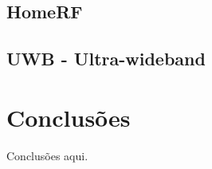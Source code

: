 \documentclass[conference]{IEEEtran}
\begin{document}
\subsection{HomeRF}

\subsection{UWB - Ultra-wideband}





\section{Conclusões}
Conclusões aqui.

{}

\end{document}
